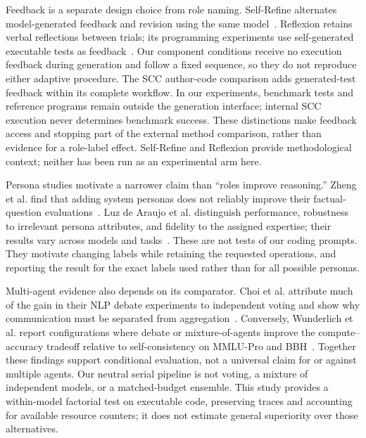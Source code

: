 Feedback is a separate design choice from role naming. Self-Refine alternates model-generated feedback and revision using the same model~\cite{madaan2023selfrefine}. Reflexion retains verbal reflections between trials; its programming experiments use self-generated executable tests as feedback~\cite{shinn2023reflexion}. Our component conditions receive no execution feedback during generation and follow a fixed sequence, so they do not reproduce either adaptive procedure. The SCC author-code comparison adds generated-test feedback within its complete workflow. In our experiments, benchmark tests and reference programs remain outside the generation interface; internal SCC execution never determines benchmark success. These distinctions make feedback access and stopping part of the external method comparison, rather than evidence for a role-label effect. Self-Refine and Reflexion provide methodological context; neither has been run as an experimental arm here.

Persona studies motivate a narrower claim than ``roles improve reasoning.'' Zheng et al. find that adding system personas does not reliably improve their factual-question evaluations~\cite{zheng2024personas}. Luz de Araujo et al. distinguish performance, robustness to irrelevant persona attributes, and fidelity to the assigned expertise; their results vary across models and tasks~\cite{araujo2025personas}. These are not tests of our coding prompts. They motivate changing labels while retaining the requested operations, and reporting the result for the exact labels used rather than for all possible personas.

Multi-agent evidence also depends on its comparator. Choi et al. attribute much of the gain in their NLP debate experiments to independent voting and show why communication must be separated from aggregation~\cite{choi2025debate}. Conversely, Wunderlich et al. report configurations where debate or mixture-of-agents improve the compute--accuracy tradeoff relative to self-consistency on MMLU-Pro and BBH~\cite{wunderlich2026compute}. Together these findings support conditional evaluation, not a universal claim for or against multiple agents. Our neutral serial pipeline is not voting, a mixture of independent models, or a matched-budget ensemble. This study provides a within-model factorial test on executable code, preserving traces and accounting for available resource counters; it does not estimate general superiority over those alternatives.
